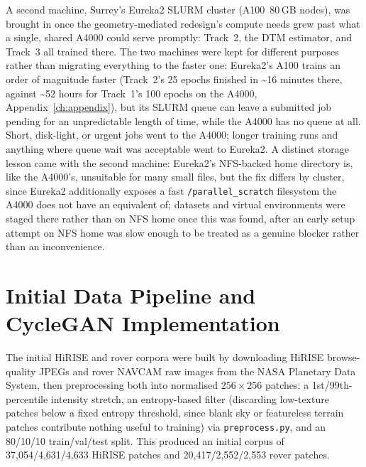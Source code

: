 A second machine, Surrey's Eureka2 SLURM cluster (A100~80\,GB nodes), was brought in once the geometry-mediated redesign's compute needs grew past what a single, shared A4000 could serve promptly: Track~2, the DTM estimator, and Track~3 all trained there. The two machines were kept for different purposes rather than migrating everything to the faster one: Eureka2's A100 trains an order of magnitude faster (Track~2's 25 epochs finished in \textasciitilde16 minutes there, against \textasciitilde52 hours for Track~1's 100 epochs on the A4000, Appendix~\ref{ch:appendix}), but its SLURM queue can leave a submitted job pending for an unpredictable length of time, while the A4000 has no queue at all. Short, disk-light, or urgent jobs went to the A4000; longer training runs and anything where queue wait was acceptable went to Eureka2. A distinct storage lesson came with the second machine: Eureka2's NFS-backed home directory is, like the A4000's, unsuitable for many small files, but the fix differs by cluster, since Eureka2 additionally exposes a fast \texttt{/parallel\_scratch} filesystem the A4000 does not have an equivalent of; datasets and virtual environments were staged there rather than on NFS home once this was found, after an early setup attempt on NFS home was slow enough to be treated as a genuine blocker rather than an inconvenience.

\section{Initial Data Pipeline and CycleGAN Implementation}
\label{sec:initial-pipeline}

The initial HiRISE and rover corpora were built by downloading HiRISE browse-quality JPEGs and rover NAVCAM raw images from the NASA Planetary Data System, then preprocessing both into normalised $256{\times}256$ patches: a 1st/99th-percentile intensity stretch, an entropy-based filter (discarding low-texture patches below a fixed entropy threshold, since blank sky or featureless terrain patches contribute nothing useful to training) via \texttt{preprocess.py}, and an 80/10/10 train/val/test split. This produced an initial corpus of 37,054/4,631/4,633 HiRISE patches and 20,417/2,552/2,553 rover patches.

